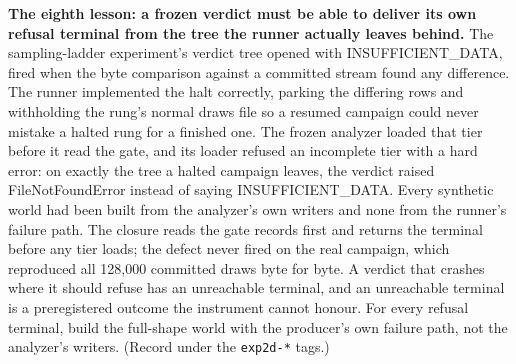 \textbf{The eighth lesson: a frozen verdict must be able to deliver its own
refusal terminal from the tree the runner actually leaves behind.}
The sampling-ladder experiment's verdict tree opened with
INSUFFICIENT\_DATA, fired when the byte comparison against a committed
stream found any difference. The runner implemented the halt
correctly, parking the differing rows and withholding the rung's
normal draws file so a resumed campaign could never mistake a halted
rung for a finished one. The frozen analyzer loaded that tier before
it read the gate, and its loader refused an incomplete tier with a
hard error: on exactly the tree a halted campaign leaves, the verdict
raised FileNotFoundError instead of saying INSUFFICIENT\_DATA. Every
synthetic world had been built from the analyzer's own writers and
none from the runner's failure path. The closure reads the gate
records first and returns the terminal before any tier loads; the
defect never fired on the real campaign, which reproduced all 128,000
committed draws byte for byte. A verdict that crashes where it should
refuse has an unreachable terminal, and an unreachable terminal is a
preregistered outcome the instrument cannot honour. For every refusal
terminal, build the full-shape world with the producer's own failure
path, not the analyzer's writers. (Record under the \texttt{exp2d-*} tags.)

